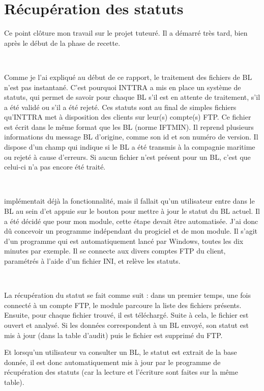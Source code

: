 \chapter{Récupération des statuts}
Ce point clôture mon travail sur le projet tuteuré. Il a démarré très tard, bien après le début de la phase de recette.

~

Comme je l'ai expliqué au début de ce rapport, le traitement des fichiers de BL n'est pas instantané. C'est pourquoi INTTRA a mis en place un système de statuts, qui permet de savoir pour chaque BL s'il est en attente de traitement, s'il a été validé ou s'il a été rejeté. Ces statuts sont au final de simples fichiers qu'INTTRA met à disposition des clients sur leur(s) compte(s) FTP. Ce fichier est écrit dans le même format que les BL (norme IFTMIN). Il reprend plusieurs informations du message BL d'origine, comme son id et son numéro de version. Il dispose d'un champ qui indique si le BL a été transmis à la compagnie maritime ou rejeté à cause d'erreurs. Si aucun fichier n'est présent pour un BL, c'est que celui-ci n'a pas encore été traité.

~

\pireus{} implémentait déjà la fonctionnalité, mais il fallait qu'un utilisateur entre dans le BL au sein d'\integrale et appuie sur le bouton pour mettre à jour le statut du BL actuel. Il a été décidé que pour mon module, cette étape devait être automatisée. J'ai donc dû concevoir un programme indépendant du progiciel et de mon module. Il s'agit d'un programme qui est automatiquement lancé par Windows, toutes les dix minutes par exemple. Il se connecte aux divers comptes FTP du client, paramétrés à l'aide d'un fichier INI, et relève les statuts.

~

La récupération du statut se fait comme suit : dans un premier temps, une fois connecté à un compte FTP, le module parcoure la liste des fichiers présents. Ensuite, pour chaque fichier trouvé, il est téléchargé. Suite à cela, le fichier est ouvert et analysé. Si les données correspondent à un BL envoyé, son statut est mis à jour (dans la table d'audit) puis le fichier est supprimé du FTP.

Et lorsqu'un utilisateur va consulter un BL, le statut est extrait de la base donnée, il est donc automatiquement mis à jour par le programme de récupération des statuts (car la lecture et l'écriture sont faites sur la même table).
